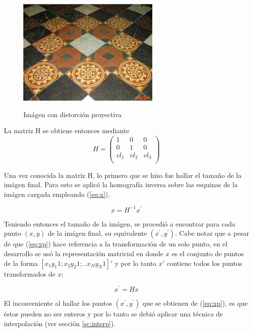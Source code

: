 \documentclass{IEEEtran}
\begin{document}
\begin{figure}[H]
\caption{Imágen con distorción proyectiva}
\centering
\includegraphics[width=7cm,natwidth=489,natheight=368]{imgs/i1Img.jpg}
\label{fig:iImg}
\end{figure} 

La matriz H se obtiene entonces mediante
\begin{equation}
H = 
\begin{pmatrix}
1 & 0 & 0 \\
0 & 1 & 0 \\
vl_1 & vl_2 & vl_3\\
\end{pmatrix}
\label{eq:h}
\end{equation} 

Una vez conocida la matriz H, lo primero que se hizo 
fue hallar el tamaño de la imágen 
final. Para esto se aplicó la homografía inversa sobre
las esquinas de la imágen cargada empleando (\ref{eq:x}).

\begin{equation}
x=H^{-1} x^{'}
\label{eq:x}
\end{equation} 

Teniendo entonces el tamaño de la imágen, se procedió a 
encontrar para cada punto $(x,y)$ de la imágen
final, su equivalente $(x^{'},y^{'})$. Cabe notar
que a pesar de que (\ref{eq:xp}) hace referencia a la transformación 
de un solo punto, en el desarrollo se usó la representación matricial
en donde $x$ es el conjunto de puntos de la forma 
$[x_1 y_1 1; x_2 y_2 1; .. x_N y_N 1]'$ y por lo tanto $x'$ contiene
todos los puntos transformados de $x$;

\begin{equation}
x^{'}=H x
\label{eq:xp}
\end{equation} 

El inconveniente al hallar los puntos $(x^{'},y^{'})$ que se obtienen de 
(\ref{eq:xp}), es que éstos pueden no ser enteros y por lo tanto
se debió aplicar una técnica de interpolación (ver sección \ref{sc:interp}).
\end{document}
